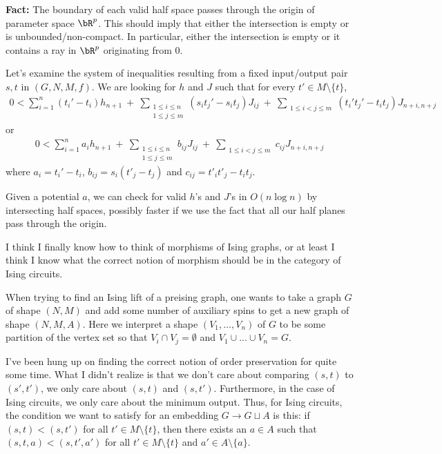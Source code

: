 \bigskip

\noindent \textbf{Fact:} The boundary of each valid half space passes through the origin of parameter space $\bR^p$. This should imply that either the intersection is empty or is unbounded/non-compact. In particular, either the intersection is empty or it contains a ray in $\bR^p$ originating from $0$.

\bigskip

Let's examine the system of inequalities resulting from a fixed input/output pair $s,t$ in $(G,N,M,f)$. We are looking for $h$ and $J$ such that for every $t' \in M \setminus \{t\}$, 
\begin{align*}
	0 < \sum_{i = 1}^n (t_i' - t_i)h_{n+1} ~+~ \sum_{\substack{1 \leq i \leq n \\ 1\leq j \leq m}} (s_it_j' - s_it_j)J_{ij} ~+~ \sum_{\substack{1\leq i < j \leq m}} (t_i't_j' - t_it_j)J_{n+i,n+j}
\end{align*}
or 
\begin{align*}
	0 < \sum_{i = 1}^n a_ih_{n+1} ~+~ \sum_{\substack{1 \leq i \leq n \\ 1\leq j \leq m}} b_{ij}J_{ij} ~+~ \sum_{\substack{1\leq i < j \leq m}} c_{ij}J_{n+i,n+j}
\end{align*}
where $a_i = t_i' - t_i$, $b_{ij} = s_i(t'_j - t_{j})$ and $c_{ij} = t'_{i} t'_j - t_i t_j$.

Given a potential $a$, we can check for valid $h$'s and $J$'s in $O(n\log n)$ by intersecting half spaces, possibly faster if we use the fact that all our half planes pass through the origin.

I think I finally know how to think of morphisms of Ising graphs, or at least I think I know what the correct notion of morphism should be in the category of Ising circuits.

When trying to find an Ising lift of a preising graph, one wants to take a graph $G$ of shape $(N,M)$ and add some number of auxiliary spins to get a new graph of shape $(N,M,A)$. Here we interpret a shape $(V_1,...,V_n)$ of $G$ to be some partition of the vertex set so that $V_i \cap V_j = \emptyset$ and $V_1 \cup ... \cup V_n = G$. 

I've been hung up on finding the correct notion of order preservation for quite some time. What I didn't realize is that we don't care about comparing $(s,t)$ to $(s',t')$, we only care about $(s,t)$ and $(s,t')$. Furthermore, in the case of Ising circuits, we only care about the minimum output. Thus, for Ising circuits, the condition we want to satisfy for an embedding $G \to G\sqcup A$ is this: if $(s,t) < (s,t')$ for all $t' \in M\setminus \{t\}$, then there exists an $a \in A$ such that $(s,t,a) < (s,t',a')$ for all $t' \in M\setminus \{t\}$ and $a' \in A\setminus \{a\}$.


